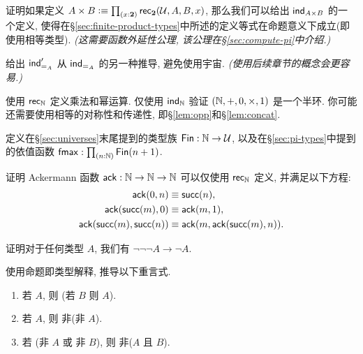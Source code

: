 \begin{ex}\label{ex:prod-via-bool}
%
证明如果定义 $A \times B \defeq \prd{x:\bool}\rec{\bool}(\UU,A,B,x)$, 那么我们可以给出 $\mathsf{ind}_{A\times B}$ 的一个定义, 使得在\S\ref{sec:finite-product-types}中所述的定义等式在命题意义下成立(即使用相等类型).
\emph{(这需要函数外延性公理, 该公理在\S\ref{sec:compute-pi}中介绍.)}
\end{ex}

\begin{ex}\label{ex:pm-to-ml}
给出 $\mathsf{ind}_{=_{A}}'$ 从 $\mathsf{ind}_{=_{A}}$ 的另一种推导, 避免使用宇宙.
  \emph{(使用后续章节的概念会更容易.)}
\end{ex}

\begin{ex}\label{ex:nat-semiring}
  使用 $\mathsf{rec}_{\mathbb{N}}$ 定义乘法和幂运算.
  仅使用 $\mathsf{ind}_{\mathbb{N}}$ 验证 $(\mathbb{N},+,0,\times,1)$ 是一个半环.
  你可能还需要使用相等的对称性和传递性, 即\S\ref{lem:opp}和\S\ref{lem:concat}.
\end{ex}

\begin{ex}\label{ex:fin}
  定义在\S\ref{sec:universes}末尾提到的类型族 $\mathsf{Fin} : \mathbb{N} \to \mathcal{U}$, 以及在\S\ref{sec:pi-types}中提到的依值函数 $\fmax : \prd{n:\nat} \Fin(n+1)$.
\end{ex}

\begin{ex}\label{ex:ackermann}
  证明 Ackermann 函数 $\mathsf{ack} : \mathbb{N} \to \mathbb{N} \to \mathbb{N}$ 可以仅使用 $\mathsf{rec}_{\mathbb{N}}$ 定义, 并满足以下方程:
  \begin{align*}
    \mathsf{ack}(0,n) &\equiv \mathsf{succ}(n), \\
    \mathsf{ack}(\mathsf{succ}(m),0) &\equiv \mathsf{ack}(m,1), \\
    \mathsf{ack}(\mathsf{succ}(m),\mathsf{succ}(n)) &\equiv \mathsf{ack}(m,\mathsf{ack}(\mathsf{succ}(m),n)).
  \end{align*}
\end{ex}

\begin{ex}\label{ex:neg-ldn}
  证明对于任何类型 $A$, 我们有 $\neg\neg\neg A \to \neg A$.
\end{ex}

\begin{ex}\label{ex:tautologies}
  使用命题即类型解释, 推导以下重言式.
  \begin{enumerate}
  \item 若 $A$, 则 (若 $B$ 则 $A$).
  \item 若 $A$, 则 非(非 $A$).
  \item 若 (非 $A$ 或 非 $B$), 则 非($A$ 且 $B$).
  \end{enumerate}
\end{ex}

